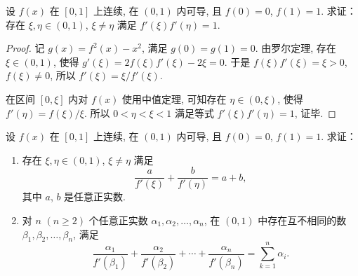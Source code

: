 \begin{exercise}
    设 $f(x)$ 在 $[0, 1]$ 上连续, 在 $(0, 1)$ 内可导, 且 $f(0) = 0$, $f(1) = 1$. 求证：存在 $\xi, \eta \in (0, 1)$, $\xi \ne \eta$ 满足 $f'(\xi) f'(\eta) = 1$.
\end{exercise}

\begin{proof}
    记 $g(x) = f^2(x) - x^2$, 满足 $g(0) = g(1) = 0$. 由罗尔定理, 存在 $\xi \in (0, 1)$, 使得 $g'(\xi) = 2f(\xi) f'(\xi) - 2\xi = 0$. 于是 $f(\xi) f'(\xi) = \xi > 0$, $f(\xi) \ne 0$, 所以 $f'(\xi) = \xi / f'(\xi)$. 
    
    在区间 $[0, \xi]$ 内对 $f(x)$ 使用中值定理, 可知存在 $\eta \in (0, \xi)$, 使得 $f'(\eta) = f(\xi) / \xi$. 所以 $0 < \eta < \xi < 1$ 满足等式 $f'(\xi) f'(\eta) = 1$, 证毕.
\end{proof}

\begin{exercise}
    设 $f(x)$ 在 $[0, 1]$ 上连续, 在 $(0, 1)$ 内可导, 且 $f(0) = 0$, $f(1) = 1$. 求证：
    \begin{enumerate}
        \item 存在 $\xi, \eta \in (0, 1)$, $\xi \ne \eta$ 满足
        \begin{equation} \label{eq:cal:rolle}
        \frac{a}{f'(\xi)} + \frac{b}{f'(\eta)} = a + b,
        \end{equation}
        其中 $a$, $b$ 是任意正实数.
        
        \item 对 $n$ $(n \ge 2)$ 个任意正实数 $\alpha_1, \alpha_2, \ldots, \alpha_n$, 在 $(0, 1)$ 中存在互不相同的数 $\beta_1, \beta_2, \ldots, \beta_n$, 满足
        \[
        \frac{\alpha_1}{f'(\beta_1)} + \frac{\alpha_2}{f'(\beta_2)} + \cdots + \frac{\alpha_n}{f'(\beta_n)} = \sum_{k = 1}^n \alpha_i.
        \]
    \end{enumerate}
\end{exercise}

